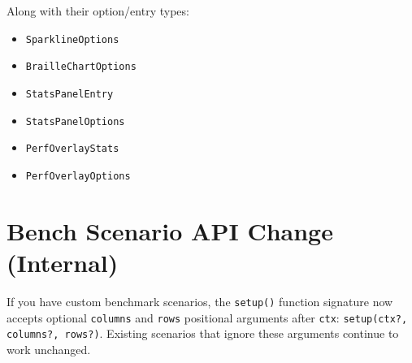 Along with their option/entry types:

\begin{itemize}
\tightlist
\item
  \texttt{S\allowbreak{}p\allowbreak{}a\allowbreak{}r\allowbreak{}k\allowbreak{}l\allowbreak{}i\allowbreak{}n\allowbreak{}e\allowbreak{}O\allowbreak{}p\allowbreak{}t\allowbreak{}i\allowbreak{}o\allowbreak{}n\allowbreak{}s}
\item
  \texttt{B\allowbreak{}r\allowbreak{}a\allowbreak{}i\allowbreak{}l\allowbreak{}l\allowbreak{}e\allowbreak{}C\allowbreak{}h\allowbreak{}a\allowbreak{}r\allowbreak{}t\allowbreak{}O\allowbreak{}p\allowbreak{}t\allowbreak{}i\allowbreak{}o\allowbreak{}n\allowbreak{}s}
\item
  \texttt{S\allowbreak{}t\allowbreak{}a\allowbreak{}t\allowbreak{}s\allowbreak{}P\allowbreak{}a\allowbreak{}n\allowbreak{}e\allowbreak{}l\allowbreak{}E\allowbreak{}n\allowbreak{}t\allowbreak{}r\allowbreak{}y}
\item
  \texttt{S\allowbreak{}t\allowbreak{}a\allowbreak{}t\allowbreak{}s\allowbreak{}P\allowbreak{}a\allowbreak{}n\allowbreak{}e\allowbreak{}l\allowbreak{}O\allowbreak{}p\allowbreak{}t\allowbreak{}i\allowbreak{}o\allowbreak{}n\allowbreak{}s}
\item
  \texttt{P\allowbreak{}e\allowbreak{}r\allowbreak{}f\allowbreak{}O\allowbreak{}v\allowbreak{}e\allowbreak{}r\allowbreak{}l\allowbreak{}a\allowbreak{}y\allowbreak{}S\allowbreak{}t\allowbreak{}a\allowbreak{}t\allowbreak{}s}
\item
  \texttt{P\allowbreak{}e\allowbreak{}r\allowbreak{}f\allowbreak{}O\allowbreak{}v\allowbreak{}e\allowbreak{}r\allowbreak{}l\allowbreak{}a\allowbreak{}y\allowbreak{}O\allowbreak{}p\allowbreak{}t\allowbreak{}i\allowbreak{}o\allowbreak{}n\allowbreak{}s}
\end{itemize}

\section{Bench Scenario API Change (Internal)}\label{record-267-bench-scenario-api-change-internal}

If you have custom benchmark scenarios, the \texttt{s\allowbreak{}e\allowbreak{}t\allowbreak{}u\allowbreak{}p\allowbreak{}(\allowbreak{})} function signature now accepts optional \texttt{c\allowbreak{}o\allowbreak{}l\allowbreak{}u\allowbreak{}m\allowbreak{}n\allowbreak{}s} and \texttt{r\allowbreak{}o\allowbreak{}w\allowbreak{}s} positional arguments after \texttt{c\allowbreak{}t\allowbreak{}x}: \texttt{s\allowbreak{}e\allowbreak{}t\allowbreak{}u\allowbreak{}p\allowbreak{}(\allowbreak{}c\allowbreak{}t\allowbreak{}x\allowbreak{}?\allowbreak{},\allowbreak{} \allowbreak{}c\allowbreak{}o\allowbreak{}l\allowbreak{}u\allowbreak{}m\allowbreak{}n\allowbreak{}s\allowbreak{}?\allowbreak{},\allowbreak{} \allowbreak{}r\allowbreak{}o\allowbreak{}w\allowbreak{}s\allowbreak{}?\allowbreak{})}. Existing scenarios that ignore these arguments continue to work unchanged.

